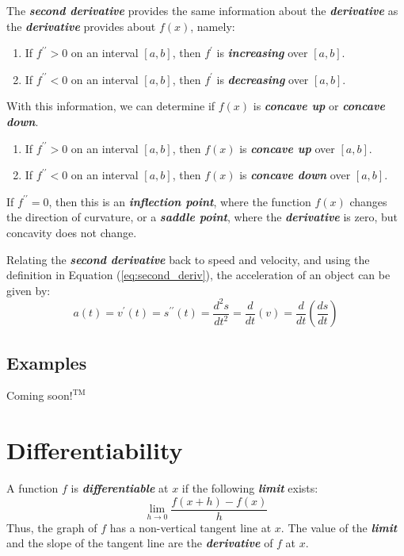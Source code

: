 The \textbf{\textit{second derivative}} provides the same information about the \textbf{\textit{derivative}} as the \textbf{\textit{derivative}} provides about $f(x)$, namely:
\begin{enumerate}
\item  If $f^{\prime\prime} > 0$ on an interval $[a,b]$, then $f^\prime$ is \textbf{\textit{increasing}} over $[a,b]$.
\item  If $f^{\prime\prime} < 0$ on an interval $[a,b]$, then $f^\prime$ is \textbf{\textit{decreasing}} over $[a,b]$.
\end{enumerate}
With this information, we can determine if $f(x)$ is \textbf{\textit{concave up}} or \textbf{\textit{concave down}}.
\begin{enumerate}
\item  If $f^{\prime\prime} > 0$ on an interval $[a,b]$, then $f(x)$ is \textbf{\textit{concave up}} over $[a,b]$.
\item  If $f^{\prime\prime} < 0$ on an interval $[a,b]$, then $f(x)$ is \textbf{\textit{concave down}} over $[a,b]$.
\end{enumerate}
If $f^{\prime\prime} = 0$, then this is an \textbf{\textit{inflection point}}, where the function $f(x)$ changes the direction of curvature, or a \textbf{\textit{saddle point}}, where the \textbf{\textit{derivative}} is zero, but concavity does not change.

\vspace{0.1in}
Relating the \textbf{\textit{second derivative}} back to speed and velocity, and using the definition in Equation (\ref{eq:second_deriv}), the acceleration of an object can be given by:
\begin{equation}
a(t) = v^\prime(t) = s^{\prime\prime}(t) = \frac{d^2 s}{dt^2} = \frac{d}{dt}\left(v\right) = \frac{d}{dt}\left(\frac{ds}{dt}\right)
\end{equation}

\begin{center}
\section*{\small Examples}
Coming soon$!^{\text{TM}}$
\end{center}

\section{Differentiability}
A function $f$ is \textbf{\textit{differentiable}} at $x$ if the following \textbf{\textit{limit}} exists:
\begin{equation}
\lim_{h \rightarrow 0} \frac{f(x+h) - f(x)}{h}
\end{equation}
Thus, the graph of $f$ has a non-vertical tangent line at $x$. The value of the \textbf{\textit{limit}} and the slope of the tangent line are the \textbf{\textit{derivative}} of $f$ at $x$.

